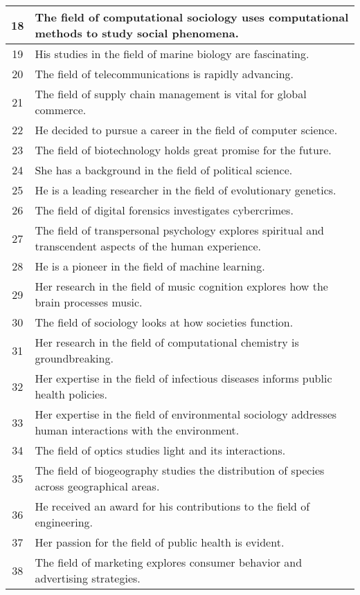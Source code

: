 \begin{longtable}{|c|p{12cm}|}
18 & The field of computational sociology uses computational methods to study social phenomena. \\ \hline
19 & His studies in the field of marine biology are fascinating. \\ \hline
20 & The field of telecommunications is rapidly advancing. \\ \hline
21 & The field of supply chain management is vital for global commerce. \\ \hline
22 & He decided to pursue a career in the field of computer science. \\ \hline
23 & The field of biotechnology holds great promise for the future. \\ \hline
24 & She has a background in the field of political science. \\ \hline
25 & He is a leading researcher in the field of evolutionary genetics. \\ \hline
26 & The field of digital forensics investigates cybercrimes. \\ \hline
27 & The field of transpersonal psychology explores spiritual and transcendent aspects of the human experience. \\ \hline
28 & He is a pioneer in the field of machine learning. \\ \hline
29 & Her research in the field of music cognition explores how the brain processes music. \\ \hline
30 & The field of sociology looks at how societies function. \\ \hline
31 & Her research in the field of computational chemistry is groundbreaking. \\ \hline
32 & Her expertise in the field of infectious diseases informs public health policies. \\ \hline
33 & Her expertise in the field of environmental sociology addresses human interactions with the environment. \\ \hline
34 & The field of optics studies light and its interactions. \\ \hline
35 & The field of biogeography studies the distribution of species across geographical areas. \\ \hline
36 & He received an award for his contributions to the field of engineering. \\ \hline
37 & Her passion for the field of public health is evident. \\ \hline
38 & The field of marketing explores consumer behavior and advertising strategies. \\ \hline

\end{longtable}
